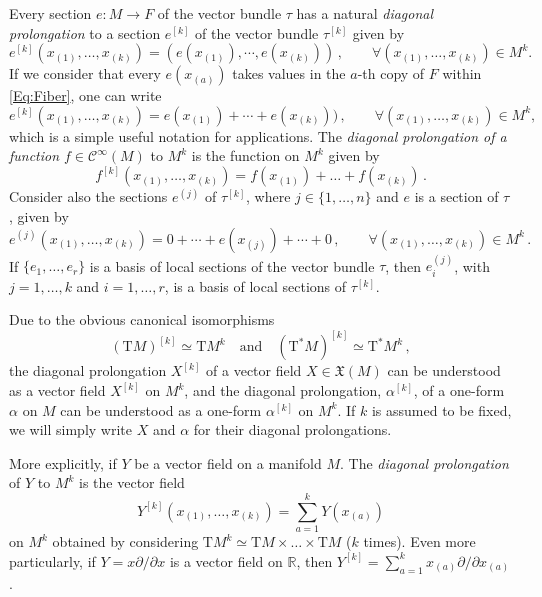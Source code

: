 \documentclass[11pt]{article}
\theoremstyle{plain}
\theoremstyle{definition}
\newcommand{\Cinfty}{\mathscr{C}^\infty}
\newcommand{\T}{\mathrm{T}}
\newcommand{\cT}{\mathrm{T}^\ast}
\newcommand{\X}{\mathfrak{X}}
\begin{document}
Every section $e:M\to F$ of the vector bundle $\tau$ has a natural {\it  diagonal prolongation} to a section $e^{[k]}$ of the vector bundle $\tau^{[k]}$ given by
\begin{equation*}
    e^{[k]}(x_{(1)},\ldots,x_{(k)})=(e(x_{(1)}),\cdots ,e(x_{(k)}))\,,\qquad \forall (x_{(1)},\ldots,x_{(k)})\in M^k.
\end{equation*}
If we consider that every $e(x_{(a)})$ takes values in the $a$-th copy of $F$ within \eqref{Eq:Fiber}, one can write
\begin{equation*}     e^{[k]}(x_{(1)},\ldots,x_{(k)})=e(x_{(1)})+\cdots +e(x_{(k)}))\,,\qquad \forall (x_{(1)},\ldots,x_{(k)})\in M^k,
\end{equation*}
which is a simple useful notation for applications. The {\it  diagonal prolongation of a function $f\in \Cinfty (M)$} to $M^k$ is the function on $M^k$ given by 
$$f^{[k]}(x_{(1)},\ldots,x_{(k)})= f(x_{(1)})+\ldots+f(x_{(k)})\,.
$$
Consider also the sections $e^{(j)}$ of $\tau^{[k]}$, where $j\in \{1,\ldots,n\}$ and $e$ is a section of $\tau$, given by
\begin{equation}\label{prol1}
e^{(j)}(x_{(1)},\dots,x_{(k)})=0+\cdots +e(x_{(j)})+\cdots+0\,,\qquad \forall (x_{(1)},\ldots,x_{(k)})\in M^k\,.
\end{equation}
If $\{e_1,\ldots, e_r\}$ is a basis of local sections of the vector bundle $\tau$, then $e_i^{(j)}$, with $j = 1,\dotsc,k$ and $i = 1,\dotsc,r$, is a basis of local sections of $\tau^{[k]}$.

Due to the obvious canonical isomorphisms
$$(\T M)^{[k]}\simeq \T M^k\quad\text{and}\quad (\cT M)^{[k]}\simeq \cT M^k\,,$$
the diagonal prolongation $X^{[k]}$ of a vector field $X\in\X(M)$ can be understood as a vector field $ {X}^{[k]}$ on $M^k$, and the diagonal prolongation, $\alpha^{[k]}$, of a one-form $\alpha$ on $M$ can be understood as a one-form $ {\alpha}^{[k]}$ on $M^k$. If $k$ is assumed to be fixed, we will simply write $ {X}$ and $ {\alpha}$ for their diagonal prolongations. 

More explicitly,  if $Y$ be a vector field on a manifold $M$. The {\it diagonal prolongation} of $Y$ to $M^k$ is the vector field  
  \[ 
        {Y}^{[k]}(x_{(1)},\ldots,x_{(k)})=\sum_{a=1}^kY(x_{(a)})\]   on $M^k$ obtained by considering $\T M^k
       \simeq \T M\times \ldots \times \T M$ ($k$ times). Even more particularly, if $Y=x\partial/\partial x$ is a vector field on $\mathbb{R}$, then $Y^{[k]}=\sum_{a=1}^kx_{(a)}\partial/\partial x_{(a)}$.
\end{document}
